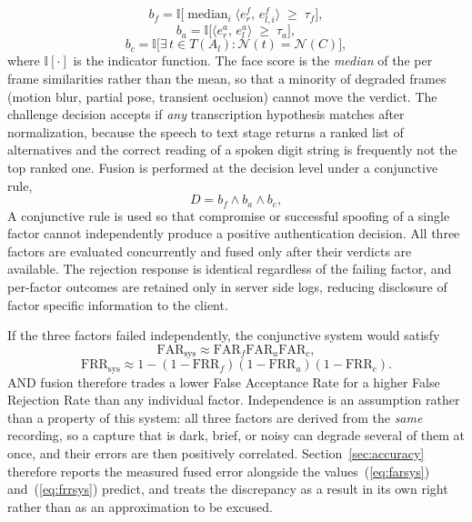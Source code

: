 \documentclass[runningheads]{llncs}
\begin{document}
{{\begin{equation}
b_f = \mathbb{I}\Big[\operatorname{median}_{i}\big\langle e_r^{f},\, e_{l,i}^{f}\big\rangle \;\geq\; \tau_f\Big],
\label{eq:face}
\end{equation}
\begin{equation}
b_a = \mathbb{I}\Big[\big\langle e_r^{a},\, e_l^{a}\big\rangle \;\geq\; \tau_a\Big],
\label{eq:voice}
\end{equation}
\begin{equation}
b_c = \mathbb{I}\Big[\exists\, t \in T(A_l): \mathcal{N}(t) = \mathcal{N}(C)\Big],
\label{eq:captcha}
\end{equation}
where $\mathbb{I}[\cdot]$ is the indicator function. The face score is the \emph{median} of the per frame similarities rather than the mean, so that a minority of degraded frames (motion blur, partial pose, transient occlusion) cannot move the verdict. The challenge decision accepts if \emph{any} transcription hypothesis matches after normalization, because the speech to text stage returns a ranked list of alternatives and the correct reading of a spoken digit string is frequently not the top ranked one.
Fusion is performed at the decision level under a conjunctive rule,
\begin{equation}
D = b_f \wedge b_a \wedge b_c ,
\label{eq:fusion}
\end{equation}
A conjunctive rule is used so that compromise or successful spoofing of a single factor cannot independently produce a positive authentication decision. All three factors are evaluated concurrently and fused only after their verdicts are available. The rejection response is identical regardless of the failing factor, and per-factor outcomes are retained only in server side logs, reducing disclosure of factor specific information to the client.

If the three factors failed independently, the conjunctive system would satisfy
\begin{equation}
\label{eq:farsys}
\mathrm{FAR}_{\mathrm{sys}}\approx \mathrm{FAR}_{f}\mathrm{FAR}_{a}\mathrm{FAR}_{c},
\end{equation}
\begin{equation}
\label{eq:frrsys}
\mathrm{FRR}_{\mathrm{sys}}\approx 1-(1-\mathrm{FRR}_{f})(1-\mathrm{FRR}_{a})(1-\mathrm{FRR}_{c}).
\end{equation}
AND fusion therefore trades a lower False Acceptance Rate for a higher False Rejection Rate than any individual factor. Independence is an assumption rather than a property of this system: all three factors are derived from the \emph{same} recording, so a capture that is dark, brief, or noisy can degrade several of them at once, and their errors are then positively correlated. Section~\ref{sec:accuracy} therefore reports the measured fused error alongside the values~(\ref{eq:farsys}) and~(\ref{eq:frrsys}) predict, and treats the discrepancy as a result in its own right rather than as an approximation to be excused.

}}
\end{document}
